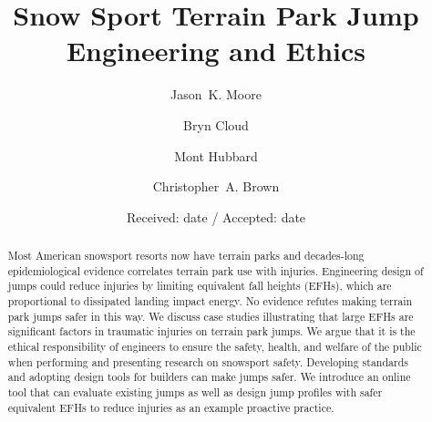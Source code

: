 \documentclass[smallextended]{svjour3}       %
\begin{document}
\title{Snow Sport Terrain Park Jump Engineering and Ethics}

\author{
  Jason~K. Moore \and
  Bryn Cloud \and
  Mont Hubbard \and
  Christopher~A. Brown
}


\date{Received: date / Accepted: date}

\maketitle

\begin{abstract}
  Most American snowsport resorts now have terrain parks and decades-long
  epidemiological evidence correlates terrain park use with injuries.
  Engineering design of jumps could reduce injuries by limiting equivalent fall
  heights (EFHs), which are proportional to dissipated landing impact energy. No evidence
  refutes making terrain park jumps safer in this way. We discuss case studies
  illustrating that large EFHs are significant factors in traumatic injuries on
  terrain park jumps. We argue that it is the ethical responsibility of
  engineers to ensure the safety, health, and welfare of the public when
  performing and presenting research on snowsport safety. Developing standards
  and adopting design tools for builders can make jumps safer. We introduce an
  online tool that can evaluate existing jumps as well as design jump profiles with
  safer equivalent EFHs to reduce injuries as an example proactive practice.
\end{abstract}
\end{document}
